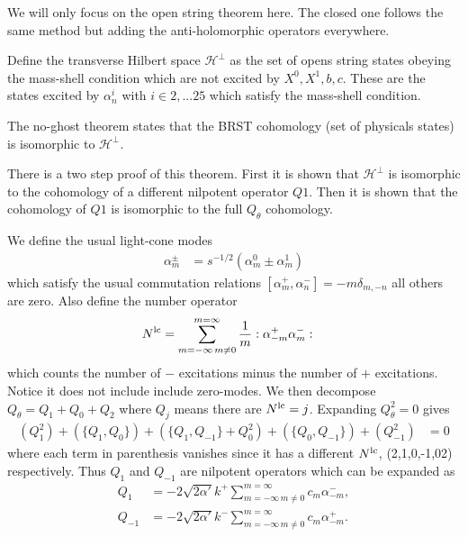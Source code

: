 \documentclass[notitlepage,amsmath,amssymb,aps, pra, 10pt]{revtex4-1}
\begin{document}
    We will only focus on the open string theorem here. The closed one follows the same method but adding the anti-holomorphic operators everywhere. 

    Define the transverse Hilbert space $\mathcal{H}^{\perp}$ as the set of opens string states obeying the mass-shell condition which are not excited by $X^0, X^1, b, c$. These are the states excited by $\alpha^i_{n}$ with $i \in {2, ...25}$ which satisfy the mass-shell condition.

    The no-ghost theorem states that the BRST cohomology (set of physicals states) is isomorphic to $\mathcal{H}^{\perp}$.

     There is a two step proof of this theorem. First it is shown that $\mathcal{H}^{\perp}$ is isomorphic to the cohomology of a different nilpotent operator $Q1$. Then it is shown that the cohomology of $Q1$ is isomorphic to the full $Q_{\theta}$ cohomology.

     We define the usual light-cone modes
     \begin{align}
       \alpha_m^{\pm} &= s^{-1/2} ( \alpha^0_m \pm \alpha^1_m)
     \end{align}
     which satisfy the usual commutation relations $[\alpha_m^+, \alpha_n ^-] = -m \delta_{m, -n}$ all others are zero. Also define the number operator
     \begin{align}
       N^{\rm lc} &= \sum_{m = -\infty\, m\neq 0} ^{m = \infty} \frac{1}{m} : \alpha^+_{-m} \alpha^-_{m}:
     \end{align}
    which counts the number of $-$ excitations minus the number of $+$ excitations. Notice it does not include include zero-modes. We then decompose $Q_{\theta} = Q_1 + Q_0 + Q_2$ where $Q_j$ means there are $N^{\rm lc} = j$. Expanding $Q_{\theta}^2 = 0$ gives
    \begin{align}
      (Q_1^2) + (\{Q_1, Q_0\}) + (\{ Q_1, Q_{-1} \} + Q_0^2) + (\{Q_0, Q_{-1}\}) + (Q_{-1}^2) &= 0
    \end{align}
    where each term in parenthesis vanishes since it has a different $N^{\rm lc}$, (2,1,0,-1,02) respectively. Thus $Q_1$ and $Q_{-1}$ are nilpotent operators which can be expanded as
    \begin{align}
        Q_1 &= -2 \sqrt{2\alpha'} k^+ \sum_{m = -\infty\, m\neq 0} ^{m = \infty} c_m \alpha_{-m}^-,\\
        Q_{-1} &= -2 \sqrt{2\alpha'} k^- \sum_{m = -\infty\, m\neq 0} ^{m = \infty} c_m \alpha_{-m}^+.
    \end{align}
    
\end{document}
